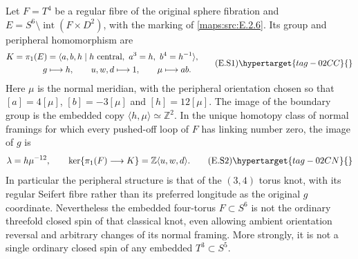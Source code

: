 \begin{proposition}\hypertarget{tag-02MA}{}\label{maps:src:E.2.10}


Let $F=T^4$ be a regular fibre of the original sphere fibration and
$E=S^6\setminus\operatorname{int}(F\times D^2)$, with the marking of
\ref{maps:src:E.2.6}. Its group and peripheral homomorphism are
\[
 \begin{split}
 K=\pi_1(E)&=\langle a,b,h\mid h\text{ central},\ a^3=h,
                                      \ b^4=h^{-1}\rangle,\\
 g&\longmapsto h,\qquad u,w,d\longmapsto1,
       \qquad \mu\longmapsto ab.
 \end{split}
 \tag{E.S1}\hypertarget{tag-02CC}{}\label{maps:eq:E.S1}
\]
Here $\mu$ is the normal meridian, with the peripheral orientation
chosen so that $[a]=4[\mu]$, $[b]=-3[\mu]$ and $[h]=12[\mu]$.
The image of the boundary group is the embedded copy
$\langle h,\mu\rangle\simeq\mathbb Z^2$. In the unique homotopy
class of normal framings for which every pushed-off loop of $F$
has linking number zero, the image of $g$ is
\[
             \lambda=h\mu^{-12},
 \qquad \ker\{\pi_1(F)\longrightarrow K\}
                 =\mathbb Z\langle u,w,d\rangle.
 \tag{E.S2}\hypertarget{tag-02CN}{}\label{maps:eq:E.S2}
\]
In particular the peripheral structure is that of the $(3,4)$
torus knot, with its regular Seifert fibre rather than its preferred
longitude as the original $g$ coordinate. Nevertheless the embedded
four-torus $F\subset S^6$ is not the ordinary threefold closed spin
of that classical knot, even allowing ambient orientation reversal
and arbitrary changes of its normal framing. More strongly, it is
not a single ordinary closed spin of any embedded $T^3\subset S^5$.

\end{proposition}


